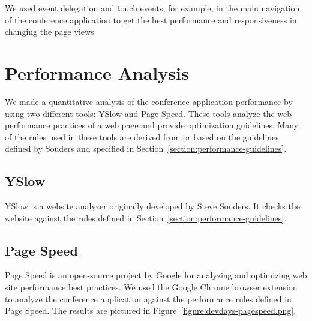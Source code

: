 We used event delegation and touch events, for example, in the main
navigation of the conference application to get the best performance
and responsiveness in changing the page views.

\section{Performance Analysis}
\label{section:performance-analysis}

We made a quantitative analysis of the conference application
performance by using two different tools: YSlow and Page Speed. These
tools analyze the web performance practices of a web page and provide
optimization guidelines. Many of the rules used in these tools are
derived from or based on the guidelines defined by Souders
\cite{souders2007high, souders2009even} and specified in
Section~\ref{section:performance-guidelines}.

\subsection{YSlow}

YSlow is a website analyzer originally developed by Steve Souders. It
checks the website against the rules defined in
Section~\ref{section:performance-guidelines}.


\subsection{Page Speed}

Page Speed \citationneeded is an open-source project by Google for
analyzing and optimizing web site performance best practices. We used
the Google Chrome browser extension to analyze the conference
application against the performance rules defined in Page Speed. The
results are pictured in Figure~\ref{figure:devdays-pagespeed.png}.

